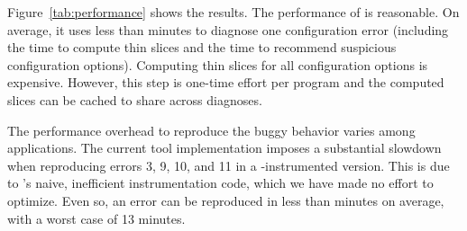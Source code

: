 Figure~\ref{tab:performance} shows the results.
The performance of \ourtool is reasonable.
On average, it uses less than \avgtime minutes to
diagnose one configuration error (including
the time to compute thin slices and the time
to recommend suspicious configuration options). Computing
thin slices for all configuration options
is expensive. However, this step is one-time effort
per program and the computed slices can be cached
to share across diagnoses. %

The performance overhead to reproduce the buggy behavior varies
among applications. The current tool implementation
imposes a substantial slowdown when reproducing
errors 3, 9, 10, and 11 in a \ourtool-instrumented version.
This is due to \ourtool's naive,
inefficient instrumentation code, which we have made no effort to optimize.
Even so, an error can be reproduced in less than \avgtime 
minutes on average, with a worst case of 13 minutes.






